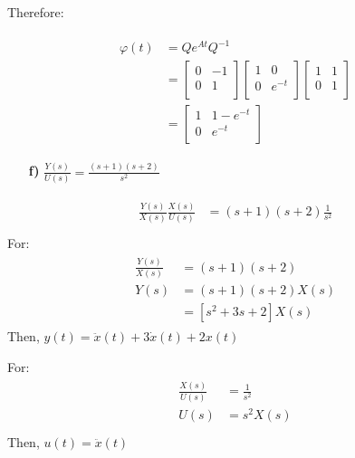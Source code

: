 \documentclass{article}
\begin{document}
Therefore: 

\begin{eqnarray*}
\begin{split}
\varphi(t) &= Qe^{At}Q^{-1} \\ &=
\begin{bmatrix}
0 & -1 \\
0 & 1 \\
\end{bmatrix}
\begin{bmatrix}
1 & 0 \\
0 & e^{-t} \\
\end{bmatrix}
\begin{bmatrix}
1 & 1 \\
0 & 1 \\
\end{bmatrix}\\ &=
\begin{bmatrix}
1 & 1-e^{-t} \\
0 & e^{-t} \\
\end{bmatrix}
\end{split}
\end{eqnarray*}


\begin{enumerate}[]
\item[\textbf{f)}] $ \frac{Y(s)}{U(s)} = \frac{(s+1)(s+2)}{s^2} $
\end{enumerate}
\begin{eqnarray*}
\begin{split}
	\frac{Y(s)}{X(s)}\frac{X(s)}{U(s)} &= (s+1)(s+2)\frac{1}{s^2} \\
\end{split}
\end{eqnarray*}
For:
\begin{eqnarray*}
	\begin{split}
	\frac{Y(s)}{X(s)} &= (s+1)(s+2)\\
	Y(s) &= (s+1)(s+2)X(s) \\
	&= [s^2+3s+2]X(s)
	\end{split}
\end{eqnarray*}
Then, $ y(t) = \ddot{x}(t) + 3\dot{x}(t) + 2x(t) $

For:
\begin{eqnarray*}
	\begin{split}
	\frac{X(s)}{U(s)} &= \frac{1}{s^2} \\
	U(s) &= s^2X(s) \\
	\end{split}
\end{eqnarray*}
Then, $ u(t) = \ddot{x}(t) $
\end{document}
